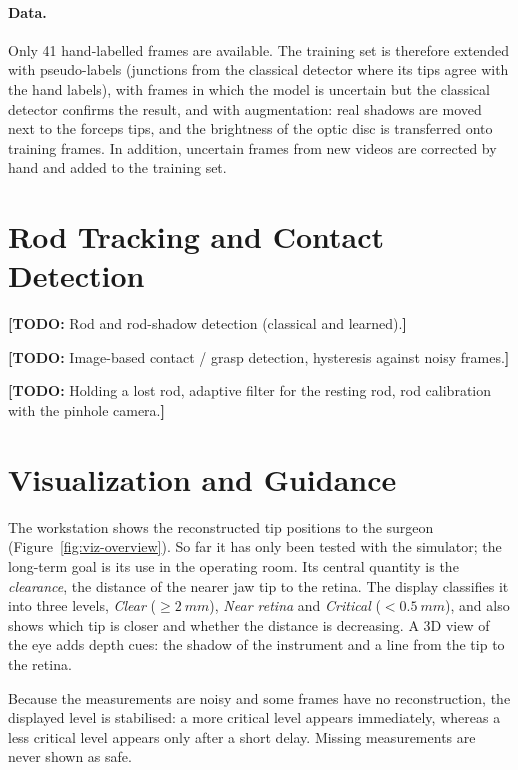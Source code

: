\documentclass[english]{tum-article}
\newcommand{\todo}[1]{\textcolor{TUMOrange}{\textbf{[TODO:} #1\textbf{]}}}
\begin{document}
\paragraph{Data.} Only 41 hand-labelled frames are available. The training set
is therefore extended with pseudo-labels (junctions from the classical detector
where its tips agree with the hand labels), with frames in which the model is
uncertain but the classical detector confirms the result, and with
augmentation: real shadows are moved next to the forceps tips, and the
brightness of the optic disc is transferred onto training frames. In addition,
uncertain frames from new videos are corrected by hand and added to the
training set.



\section{Rod Tracking and Contact Detection}
\label{sec:rod}

\todo{Rod and rod-shadow detection (classical and learned).}

\todo{Image-based contact / grasp detection, hysteresis against noisy frames.}

\todo{Holding a lost rod, adaptive filter for the resting rod, rod
  calibration with the pinhole camera.}

\section{Visualization and Guidance}
\label{sec:viz}

The workstation shows the reconstructed tip positions to the surgeon
(Figure~\ref{fig:viz-overview}). So far it has only been tested with the
simulator; the long-term goal is its use in the operating room. Its central quantity is the
\emph{clearance}, the distance of the nearer jaw tip to the retina. The display
classifies it into three levels, \emph{Clear} ($\geq \SI{2}{mm}$), \emph{Near
retina} and \emph{Critical} ($< \SI{0.5}{mm}$), and also shows which tip is
closer and whether the distance is decreasing. A 3D view of the eye adds depth
cues: the shadow of the instrument and a line from the tip to the retina.

Because the measurements are noisy and some frames have no reconstruction, the
displayed level is stabilised: a more critical level appears immediately,
whereas a less critical level appears only after a short delay. Missing
measurements are never shown as safe.
\end{document}
